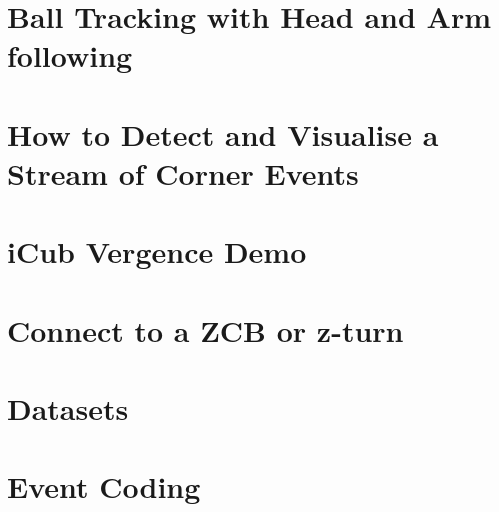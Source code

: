 \documentclass[twoside]{book}
\newcommand{\+}{\discretionary{\mbox{\scriptsize$\hookleftarrow$}}{}{}}
\begin{document}
\chapter{Ball Tracking with Head and Arm following}
\label{md__media_workspace_projects_event-driven_documentation_application_instructions_4balldemo}

\chapter{How to Detect and Visualise a Stream of Corner Events}
\label{md__media_workspace_projects_event-driven_documentation_application_instructions_5corners}

\chapter{i\+Cub Vergence Demo}
\label{md__media_workspace_projects_event-driven_documentation_application_instructions_6vergence}

\chapter{Connect to a Z\+CB or z-\/turn}
\label{md__media_workspace_projects_event-driven_documentation_connect_to_zcb}

\chapter{Datasets}
\label{md__media_workspace_projects_event-driven_documentation_datasets}

\chapter{Event Coding}
\label{md__media_workspace_projects_event-driven_documentation_eventcodecs}

\end{document}
